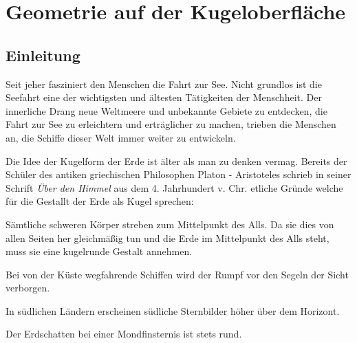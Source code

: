 \chapter{Geometrie auf der Kugeloberfläche\label{chapter:kugel}}
\begin{refsection}

\section{Einleitung}

Seit jeher fasziniert den Menschen die Fahrt zur See. Nicht grundlos ist die Seefahrt eine der wichtigsten und ältesten Tätigkeiten der Menschheit. Der innerliche Drang neue Weltmeere und unbekannte Gebiete zu entdecken, die Fahrt zur See zu erleichtern und erträglicher zu machen, trieben die Menschen an, die Schiffe dieser Welt immer weiter zu entwickeln.

Die Idee der Kugelform der Erde ist älter als man zu denken vermag. Bereits der Schüler des antiken griechischen Philosophen Platon - Aristoteles schrieb in seiner Schrift \textit{Über den Himmel} aus dem 4. Jahrhundert v. Chr. etliche Gründe welche für die Gestallt der Erde als Kugel sprechen:\\

\begin{compactitem}
      \item Sämtliche schweren Körper streben zum Mittelpunkt des Alls. Da sie dies von allen Seiten her gleichmäßig tun und die Erde im Mittelpunkt des Alls steht, muss sie eine kugelrunde Gestalt annehmen. 
\item Bei von der Küste wegfahrende Schiffen wird der Rumpf vor den Segeln der Sicht verborgen. 
\item In südlichen Ländern erscheinen südliche Sternbilder höher über dem Horizont.
\item Der Erdschatten bei einer Mondfinsternis ist stets rund.
\end{compactitem}



\end{refsection}
